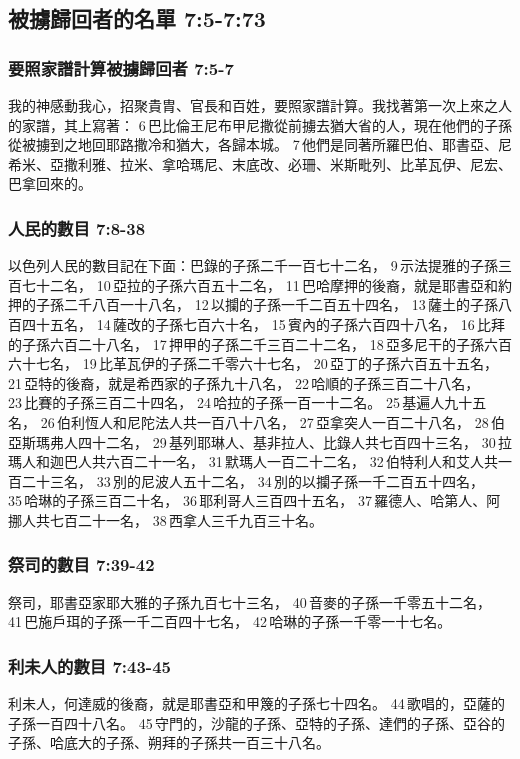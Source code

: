 \subsection{被擄歸回者的名單 7:5-7:73}
\subsubsection{要照家譜計算被擄歸回者 7:5-7}
我的神感動我心，招聚貴胄、官長和百姓，要照家譜計算。我找著第一次上來之人的家譜，其上寫著： 6 巴比倫王尼布甲尼撒從前擄去猶大省的人，現在他們的子孫從被擄到之地回耶路撒冷和猶大，各歸本城。 7 他們是同著所羅巴伯、耶書亞、尼希米、亞撒利雅、拉米、拿哈瑪尼、末底改、必珊、米斯毗列、比革瓦伊、尼宏、巴拿回來的。

\subsubsection{人民的數目 7:8-38}
以色列人民的數目記在下面：巴錄的子孫二千一百七十二名， 9 示法提雅的子孫三百七十二名， 10 亞拉的子孫六百五十二名， 11 巴哈摩押的後裔，就是耶書亞和約押的子孫二千八百一十八名， 12 以攔的子孫一千二百五十四名， 13 薩土的子孫八百四十五名， 14 薩改的子孫七百六十名， 15 賓內的子孫六百四十八名， 16 比拜的子孫六百二十八名， 17 押甲的子孫二千三百二十二名， 18 亞多尼干的子孫六百六十七名， 19 比革瓦伊的子孫二千零六十七名， 20 亞丁的子孫六百五十五名， 21 亞特的後裔，就是希西家的子孫九十八名， 22 哈順的子孫三百二十八名， 23 比賽的子孫三百二十四名， 24 哈拉的子孫一百一十二名。 25 基遍人九十五名， 26 伯利恆人和尼陀法人共一百八十八名， 27 亞拿突人一百二十八名， 28 伯亞斯瑪弗人四十二名， 29 基列耶琳人、基非拉人、比錄人共七百四十三名， 30 拉瑪人和迦巴人共六百二十一名， 31 默瑪人一百二十二名， 32 伯特利人和艾人共一百二十三名， 33 別的尼波人五十二名， 34 別的以攔子孫一千二百五十四名， 35 哈琳的子孫三百二十名， 36 耶利哥人三百四十五名， 37 羅德人、哈第人、阿挪人共七百二十一名， 38 西拿人三千九百三十名。

\subsubsection{祭司的數目 7:39-42}
祭司，耶書亞家耶大雅的子孫九百七十三名， 40 音麥的子孫一千零五十二名， 41 巴施戶珥的子孫一千二百四十七名， 42 哈琳的子孫一千零一十七名。

\subsubsection{利未人的數目 7:43-45}
利未人，何達威的後裔，就是耶書亞和甲篾的子孫七十四名。 44 歌唱的，亞薩的子孫一百四十八名。 45 守門的，沙龍的子孫、亞特的子孫、達們的子孫、亞谷的子孫、哈底大的子孫、朔拜的子孫共一百三十八名。

